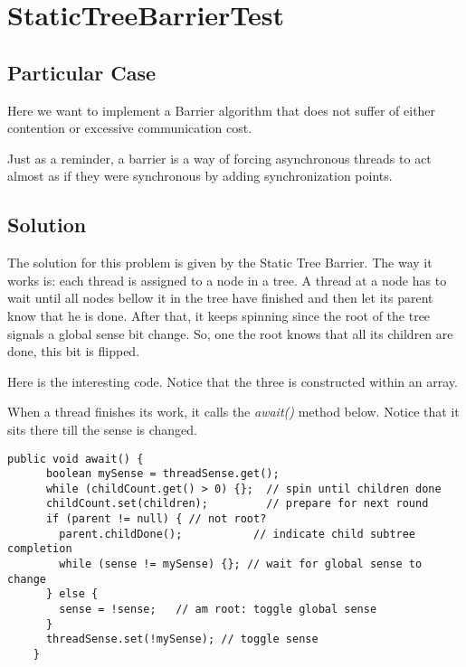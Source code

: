 \section{\textbf{StaticTreeBarrierTest}}
\subsection{Particular Case}
\par
Here we want to implement a Barrier algorithm that does not suffer of either
contention or excessive communication cost. 
\par
Just as a reminder, a barrier is a way of forcing asynchronous threads to act
almost as if they were synchronous by adding synchronization points.
\par
\subsection{Solution}
\par
The solution for this problem is given by the Static Tree Barrier. The way it
works is: each thread is assigned to a node in a tree. A thread at a node has to
wait until all nodes bellow it in the tree have finished and then let its parent
know that he is done. After that, it keeps spinning since the root of the tree
signals a global sense bit change. So, one the root knows that all its children
are done, this bit is flipped.
\par
Here is the interesting code. Notice that the three is constructed within an
array.
\par
When a thread finishes its work, it calls the \textit{await()} method below. Notice
that it sits there till the sense is changed.
\par
\hfill
\begin{lstlisting}[style=numbers]
    public void await() {
      boolean mySense = threadSense.get();
      while (childCount.get() > 0) {};  // spin until children done
      childCount.set(children);         // prepare for next round
      if (parent != null) { // not root?
        parent.childDone();           // indicate child subtree completion
        while (sense != mySense) {}; // wait for global sense to change
      } else {
        sense = !sense;   // am root: toggle global sense
      }
      threadSense.set(!mySense); // toggle sense
    }
\end{lstlisting}
\hfill
\par
